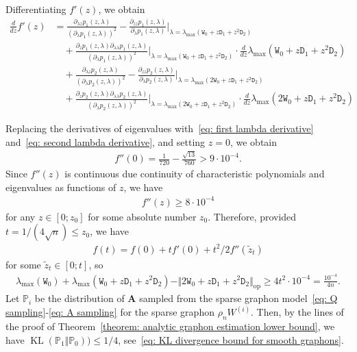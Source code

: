 \documentclass[11pt]{article}
\newcommand{\op}{\mathrm{op}}
\newcommand{\bA}{\bm{A}}
\newcommand{\bbP}{\mathbb{P}}
\newcommand{\KL}[2]{\operatorname{KL}\left (#1\Vert #2 \right )}
\newcommand{\<}{\langle}
\renewcommand{\>}{\rangle}
\newcommand{\ttW}{\mathtt{W}}
\newcommand{\ttD}{\mathtt{D}}
\theoremstyle{plain}
\theoremstyle{definition}
\theoremstyle{remark}
\begin{document}
{   Differentiating $f'(z)$, we obtain
   \begin{align*}
        \frac{d}{dz} f'(z) & = \frac{\partial_{\lambda z} p_1(z, \lambda)}{(\partial_\lambda p_1(z, \lambda))^2} - \frac{\partial_{zz} p_1(z, \lambda)}{\partial_{\lambda} p_1(z, \lambda)} \bigg |_{\lambda = \lambda_{\max}(\ttW_0 + z \ttD_1 + z^2 \ttD_2)} \\
        & \quad + \frac{\partial_z p_1(z, \lambda) \partial_{\lambda \lambda} p_1(z, \lambda)}{(\partial_\lambda p_1(z, \lambda))^2} \bigg |_{\lambda = \lambda_{\max}(\ttW_0 + z \ttD_1 + z^2 \ttD_2)} \cdot \frac{d}{dz} \lambda_{\max}(\ttW_0 + z \ttD_1 + z^2 \ttD_2) \\
        & \quad + \frac{\partial_{\lambda z} p_2(z, \lambda)}{(\partial_\lambda p_2(z, \lambda))^2} - \frac{\partial_{zz} p_2(z, \lambda)}{\partial_{\lambda} p_2(z, \lambda)} \bigg |_{\lambda = \lambda_{\max}(2\ttW_0 + z \ttD_1 + z^2 \ttD_2)} \\
        & \quad + \frac{\partial_z p_2(z, \lambda) \partial_{\lambda \lambda} p_2(z, \lambda)}{(\partial_\lambda p_2(z, \lambda))^2} \bigg |_{\lambda = \lambda_{\max}(2\ttW_0 + z \ttD_1 + z^2 \ttD_2)} \cdot \frac{d}{dz} \lambda_{\max}(2\ttW_0 + z \ttD_1 + z^2 \ttD_2) 
   \end{align*}
   
   Replacing the derivatives of eigenvalues with~\eqref{eq: first lambda derivative} and~\eqref{eq: second lambda derivative}, and setting $z = 0$, we obtain
   \begin{align*}
    f''(0) = \frac{1}{720} - \frac{\sqrt{13}}{760} > 9 \cdot 10^{-4}.
   \end{align*}
   Since $f''(z)$ is continuous due continuity of characteristic polynomials and eigenvalues as functions of $z$, we have
   \begin{align*}
        f''(z) \ge 8 \cdot 10^{-4}
   \end{align*}
   for any $z \in [0; z_0]$ for some absolute number $z_0$. Therefore, provided $t = 1/(4 \sqrt{n}) \le z_0$, we have
   \begin{align*}
    f(t) = f(0) + t f'(0) + t^2/2 f''(\tilde{z}_t)
   \end{align*}
   for some $\tilde{z}_t \in [0; t]$, so
   \begin{align}
    \label{eq: deficit lower bound}
        \lambda_{\max}(\ttW_0) + \lambda_{\max}(\ttW_0 + z \ttD_1 + z^2 \ttD_2) - \Vert 2 \ttW_0 + z \ttD_1 + z^2 \ttD_2 \Vert_{\op} \ge 4 t^2 \cdot 10^{-4} = \frac{10^{-4}}{4n}.
   \end{align}
   Let $\bbP_{i}$ be the distribution of $\bA$ sampled from the sparse graphon model~\eqref{eq: Q sampling}-\eqref{eq: A sampling} for the sparse graphon $\rho_n W^{(i)}$. Then, by the lines of the proof of Theorem~\ref{theorem: analytic graphon estimation lower bound}, we have $\KL{\bbP_1}{\bbP_0}) \le 1/4$, see~\eqref{eq: KL divergence bound for smooth graphons}.

}
\end{document}
